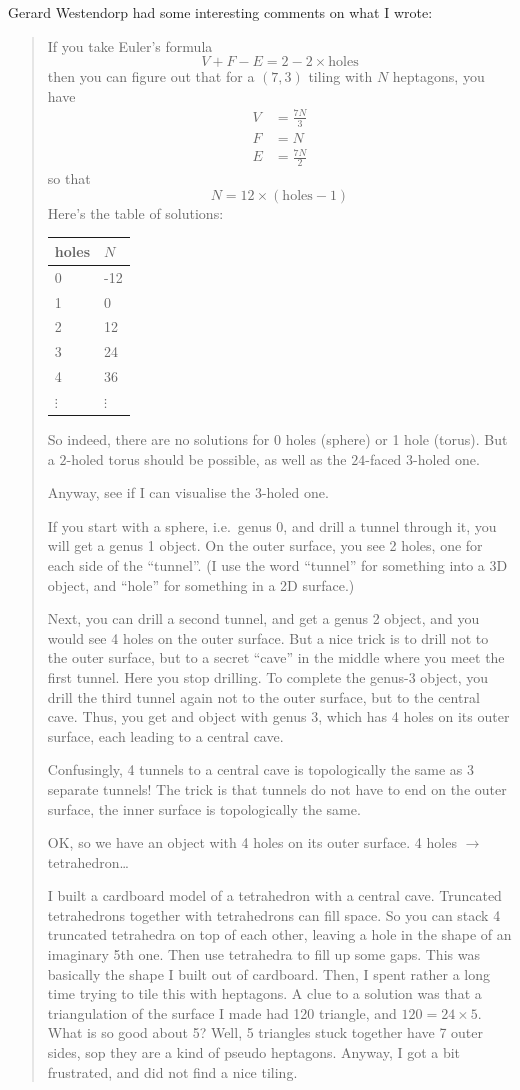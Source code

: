 \documentclass{article}
\begin{document}
Gerard Westendorp had some interesting comments on what I wrote:

\begin{quote}
If you take Euler's formula \[V+F-E = 2-2\times\text{holes}\] then you
can figure out that for a \((7,3)\) tiling with \(N\) heptagons, you
have \[
  \begin{aligned}
    V &= \frac{7N}{3}
  \\F &= N
  \\E &= \frac{7N}{2}    
  \end{aligned}
\] so that \[N = 12\times(\text{holes}-1)\] Here's the table of
solutions:

\begin{longtable}[]{@{}ll@{}}
\toprule
holes & \(N\)\tabularnewline
\midrule
\endhead
0 & -12\tabularnewline
1 & 0\tabularnewline
2 & 12\tabularnewline
3 & 24\tabularnewline
4 & 36\tabularnewline
\(\vdots\) & \(\vdots\)\tabularnewline
\bottomrule
\end{longtable}

So indeed, there are no solutions for 0 holes (sphere) or 1 hole
(torus). But a \(2\)-holed torus should be possible, as well as the
\(24\)-faced \(3\)-holed one.

Anyway, see if I can visualise the \(3\)-holed one.

If you start with a sphere, i.e.~genus 0, and drill a tunnel through it,
you will get a genus 1 object. On the outer surface, you see 2 holes,
one for each side of the ``tunnel''. (I use the word ``tunnel'' for
something into a 3D object, and ``hole'' for something in a 2D surface.)

Next, you can drill a second tunnel, and get a genus 2 object, and you
would see 4 holes on the outer surface. But a nice trick is to drill not
to the outer surface, but to a secret ``cave'' in the middle where you
meet the first tunnel. Here you stop drilling. To complete the genus-3
object, you drill the third tunnel again not to the outer surface, but
to the central cave. Thus, you get and object with genus 3, which has 4
holes on its outer surface, each leading to a central cave.

Confusingly, 4 tunnels to a central cave is topologically the same as 3
separate tunnels! The trick is that tunnels do not have to end on the
outer surface, the inner surface is topologically the same.

OK, so we have an object with 4 holes on its outer surface. 4 holes
\(\to\) tetrahedron\ldots{}

I built a cardboard model of a tetrahedron with a central cave.
Truncated tetrahedrons together with tetrahedrons can fill space. So you
can stack 4 truncated tetrahedra on top of each other, leaving a hole in
the shape of an imaginary 5th one. Then use tetrahedra to fill up some
gaps. This was basically the shape I built out of cardboard. Then, I
spent rather a long time trying to tile this with heptagons. A clue to a
solution was that a triangulation of the surface I made had 120
triangle, and \(120 = 24\times5\). What is so good about 5? Well, 5
triangles stuck together have 7 outer sides, sop they are a kind of
pseudo heptagons. Anyway, I got a bit frustrated, and did not find a
nice tiling.


\end{quote}
\end{document}
